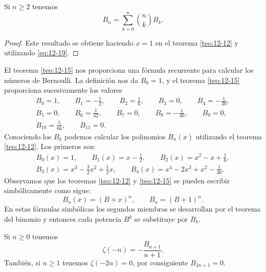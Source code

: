 \documentclass[12pt,a4paper]{book}
\begin{document}
    \begin{teorema}\label{teo:12-15}
        Si $n\geq2$ tenemos
        \begin{equation*}
            B_{n}=\sum_{k=0}^{n}\binom{n}{k}B_{k}.
        \end{equation*}
    \end{teorema}

    \begin{proof}
        Este resultado se obtiene haciendo $x=1$ en el teorema \ref{teo:12-12} y utilizando
        \eqref{eq:12-19}.
    \end{proof}

    El teorema \ref{teo:12-15} nos proporciona una fórmula recurrente para calcular los
    números de Bernoulli. La definición nos da $B_{0}=1$, y el teorema \ref{teo:12-15}
    proporciona sucesivamente los valores
    \begin{gather*}
        B_{0}=1,\qquad B_{1}=-\frac{1}{2},\qquad B_{2}=\frac{1}{6},\qquad B_{3}=0,\qquad B_{4}=-\frac{1}{30},\\
        B_{5}=0,\qquad B_{6}=\frac{1}{42},\qquad B_{7}=0,\qquad B_{8}=-\frac{1}{30},\qquad B_{9}=0,\\
        B_{10}=\frac{5}{66},\qquad B_{11}=0.
    \end{gather*}
    Conociendo los $B_{k}$ podemos calcular los polinomios $B_{n}(x)$ utilizando el teorema
    \ref{teo:12-12}. Los primeros son:
    \begin{gather*}
        B_{0}(x)=1,\qquad B_{1}(x)=x-\frac{1}{2},\qquad B_{2}(x)=x^{2}-x+\frac{1}{6},\\
        B_{3}(x)=x^{3}-\frac{3}{2}x^{2}+\frac{1}{2}x,\qquad B_{4}(x)=x^{4}-2x^{3}+x^{2}-\frac{1}{30}.
    \end{gather*}
    Observamos que los teoremas \ref{teo:12-12} y \ref{teo:12-15} se pueden escribir
    simbólicamente como sigue:
    \begin{equation*}
        B_{n}(x)=(B+x)^{n},\qquad B_{n}=(B+1)^{n}.
    \end{equation*}
    En estas fórmulas simbólicas los segundos miembros se desarrollan por el teorema del
    binomio y entonces cada potencia $B^{k}$ se substituye por $B_{k}$.

    \begin{teorema}\label{teo:12-16}
        Si $n\geq0$ tenemos
        \begin{equation}\label{eq:12-20}
            \zeta(-n)=-\frac{B_{n+1}}{n+1}.
        \end{equation}
        También, si $n\geq1$ tenemos $\zeta(-2n)=0$, por consiguiente $B_{2n+1}=0$.
    \end{teorema}
\end{document}

